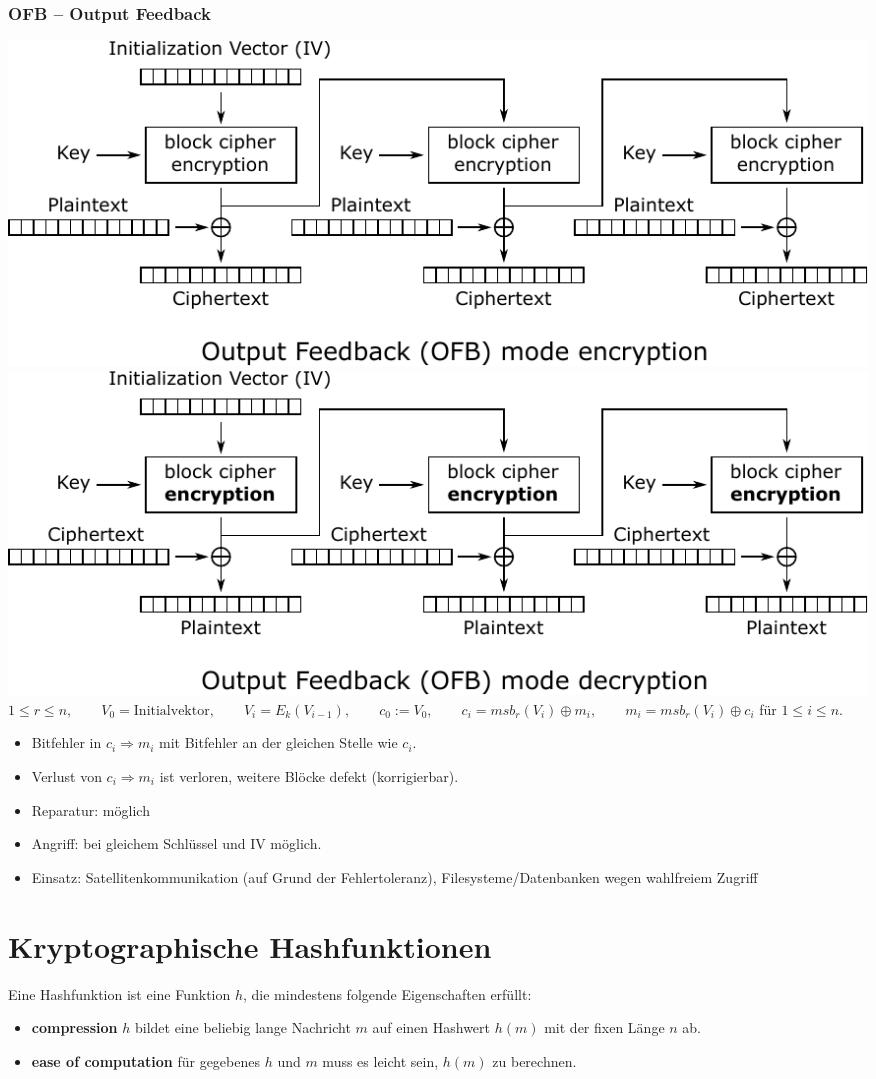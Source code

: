 \documentclass[8pt,a4paper,landscape]{article}
\begin{document}
\begin{multicols}{4}
\subsubsection{OFB – Output Feedback}
\includegraphics[width=\columnwidth]{OFB_encryption.pdf}
\includegraphics[width=\columnwidth]{OFB_decryption.pdf}
\(1 \leq r \leq n, \qquad V_0=\textrm{Initialvektor}, \qquad V_i=E_k(V_{i-1}), \qquad c_0 := V_0, \qquad c_i =msb_r(V_i) \oplus m_i, \qquad m_i =msb_r(V_i) \oplus c_i \) für \(1\leq i \leq n\).
\begin{itemize}[itemsep=1pt]
\item Bitfehler in \(c_i \Rightarrow m_i \) mit Bitfehler an der gleichen Stelle wie \(c_i\).
\item Verlust von \(c_i \Rightarrow m_i \) ist verloren, weitere Blöcke defekt (korrigierbar).
\item Reparatur: möglich
\item Angriff: bei gleichem Schlüssel und IV möglich.
\item Einsatz: Satellitenkommunikation (auf Grund der Fehlertoleranz), Filesysteme/Datenbanken wegen wahlfreiem Zugriff
\end{itemize}

\section{Kryptographische Hashfunktionen}
Eine Hashfunktion ist eine Funktion $h$, die mindestens folgende Eigenschaften erfüllt: \begin{itemize}
 \item \textbf{compression} $h$ bildet eine beliebig lange Nachricht $m$ auf einen Hashwert $h(m)$ mit der fixen Länge $n$ ab.
 \item \textbf{ease of computation} für gegebenes $h$ und $m$ muss es leicht sein, $h(m)$ zu berechnen.
 \end{itemize}


\end{multicols}
\end{document}
